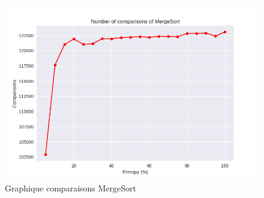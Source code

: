 \documentclass[10pt,a4paper]{article}
\begin{document}
            \begin{figure}
                \centering
                \includegraphics[width=1\textwidth]{graphique/MergeSort/GraphComparisonsMergeSort.png}
                \caption{Graphique comparaisons MergeSort}
                \label{fig:mesh1}
            \end{figure}
\end{document}
